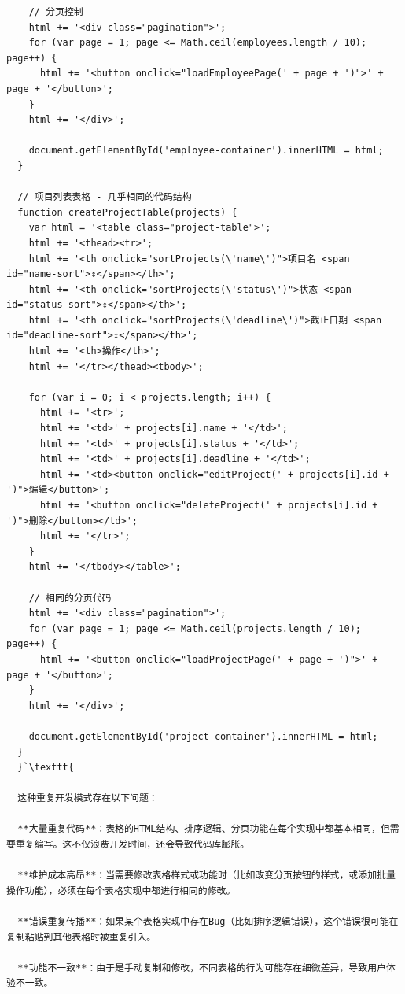 {{\begin{lstlisting}
    // 分页控制
    html += '<div class="pagination">';
    for (var page = 1; page <= Math.ceil(employees.length / 10); page++) {
      html += '<button onclick="loadEmployeePage(' + page + ')">' + page + '</button>';
    }
    html += '</div>';
    
    document.getElementById('employee-container').innerHTML = html;
  }
  
  // 项目列表表格 - 几乎相同的代码结构
  function createProjectTable(projects) {
    var html = '<table class="project-table">';
    html += '<thead><tr>';
    html += '<th onclick="sortProjects(\'name\')">项目名 <span id="name-sort">↕</span></th>';
    html += '<th onclick="sortProjects(\'status\')">状态 <span id="status-sort">↕</span></th>';
    html += '<th onclick="sortProjects(\'deadline\')">截止日期 <span id="deadline-sort">↕</span></th>';
    html += '<th>操作</th>';
    html += '</tr></thead><tbody>';
    
    for (var i = 0; i < projects.length; i++) {
      html += '<tr>';
      html += '<td>' + projects[i].name + '</td>';
      html += '<td>' + projects[i].status + '</td>';
      html += '<td>' + projects[i].deadline + '</td>';
      html += '<td><button onclick="editProject(' + projects[i].id + ')">编辑</button>';
      html += '<button onclick="deleteProject(' + projects[i].id + ')">删除</button></td>';
      html += '</tr>';
    }
    html += '</tbody></table>';
    
    // 相同的分页代码
    html += '<div class="pagination">';
    for (var page = 1; page <= Math.ceil(projects.length / 10); page++) {
      html += '<button onclick="loadProjectPage(' + page + ')">' + page + '</button>';
    }
    html += '</div>';
    
    document.getElementById('project-container').innerHTML = html;
  }
  }`\texttt{

  这种重复开发模式存在以下问题：

  **大量重复代码**：表格的HTML结构、排序逻辑、分页功能在每个实现中都基本相同，但需要重复编写。这不仅浪费开发时间，还会导致代码库膨胀。

  **维护成本高昂**：当需要修改表格样式或功能时（比如改变分页按钮的样式，或添加批量操作功能），必须在每个表格实现中都进行相同的修改。

  **错误重复传播**：如果某个表格实现中存在Bug（比如排序逻辑错误），这个错误很可能在复制粘贴到其他表格时被重复引入。

  **功能不一致**：由于是手动复制和修改，不同表格的行为可能存在细微差异，导致用户体验不一致。


\end{lstlisting}}}
